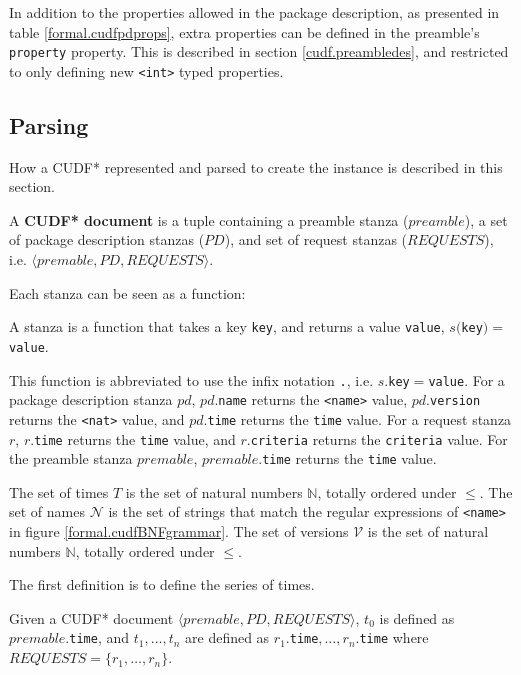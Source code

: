 In addition to the properties allowed in the package description, as presented in table \ref{formal.cudfpdprops}, extra properties can be defined in the preamble's \texttt{property} property.
This is described in section \ref{cudf.preambledes}, and restricted to only defining new \texttt{<int>} typed properties.

\subsection{Parsing}
How a CUDF* represented and parsed to create the \modelname instance is described in this section.

\begin{defs}
A \textbf{CUDF* document} is a tuple containing a preamble stanza ($preamble$), a set of package description stanzas ($PD$), and set of request stanzas ($REQUESTS$), i.e. $\langle premable, PD, REQUESTS \rangle$.
\end{defs}

Each stanza can be seen as a function:
\begin{defs}
A stanza is a function that takes a key \texttt{key}, and returns a value \texttt{value}, $s($\texttt{key}$) = $\texttt{value}. 
\end{defs}

This function is abbreviated to use the infix notation \texttt{.}, i.e. $s$.\texttt{key}$ = $\texttt{value}.
For a package description stanza $pd$, $pd$.\texttt{name} returns the \texttt{<name>} value,
$pd$.\texttt{version} returns the \texttt{<nat>} value, and $pd$.\texttt{time} returns the \texttt{time} value.
For a request stanza $r$, $r$.\texttt{time} returns the \texttt{time} value, and $r$.\texttt{criteria} returns the \texttt{criteria} value.
For the preamble stanza $premable$, $premable$.\texttt{time} returns the \texttt{time} value.

The set of times $T$ is the set of natural numbers $\mathbb{N}$, totally ordered under $\leq$.
The set of names $\mathcal{N}$ is the set of strings that match the regular expressions of \texttt{<name>} in figure \ref{formal.cudfBNFgrammar}.
The set of versions $\mathcal{V}$ is the set of natural numbers $\mathbb{N}$, totally ordered under $\leq$. 

The first definition is to define the series of times.
\begin{defs}
Given a CUDF* document $\langle premable, PD, REQUESTS \rangle$, $t_0$ is defined as $premable$.\texttt{time},
and $t_1,\ldots,t_n$ are defined as $r_1$.\texttt{time}$,\ldots,r_n$.\texttt{time} where $REQUESTS = \{r_1,\ldots,r_n\}$.
\end{defs}


